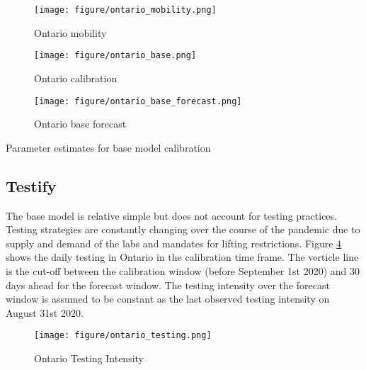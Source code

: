 \documentclass[12pt]{article}\usepackage[]{graphicx}\usepackage[]{color}
\begin{document}
\begin{figure}[ht!]
\color{fgcolor}
\texttt{[image: figure/ontario\_mobility.png]}

\caption{Ontario mobility}
\label{fig:Ont_mobility}
\end{figure}



\begin{figure}[ht!]
\color{fgcolor}
\texttt{[image: figure/ontario\_base.png]}

\caption{Ontario calibration}
\label{fig:Ont_calibration}
\end{figure}

\begin{figure}[ht!]
\color{fgcolor}
\texttt{[image: figure/ontario\_base\_forecast.png]}

\caption{Ontario base forecast}
\label{fig:Ont_calibration_base_forecast}
\end{figure}

\begin{table}
\centering

\caption{Parameter estimates for base model calibration}
\label{table:base}
\end{table}


\FloatBarrier

\subsection{Testify}

The base model is relative simple but does not account for testing practices. Testing strategies are constantly changing over the course of the pandemic due to supply and demand of the labs and mandates for lifting restrictions. Figure \ref{fig:Ont_testing} shows the daily testing in Ontario in the calibration time frame. The verticle line is the cut-off between the calibration window (before September 1st 2020) and 30 days ahead for the forecast window. The testing intensity over the forecast window is assumed to be constant as the last observed testing intensity on August 31st 2020.  


\begin{figure}[ht!]
\color{fgcolor}
\texttt{[image: figure/ontario\_testing.png]}


\caption{Ontario Testing Intensity}
\label{fig:Ont_testing}
\end{figure}
\end{document}
